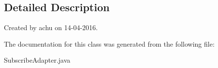 \subsection{\-Detailed \-Description}
\-Created by achu on 14-\/04-\/2016. 

\-The documentation for this class was generated from the following file\-:\begin{DoxyCompactItemize}
\item 
\-Subscribe\-Adapter.\-java\end{DoxyCompactItemize}
